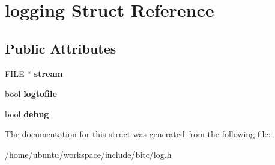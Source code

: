 \hypertarget{structlogging}{\section{logging Struct Reference}
\label{structlogging}
}
\subsection*{Public Attributes}
\begin{DoxyCompactItemize}
\item 
\hypertarget{structlogging_ac5910ff60fc85c3fe0586ee1e0fbaacf}{F\-I\-L\-E $\ast$ {\bfseries stream}}\label{structlogging_ac5910ff60fc85c3fe0586ee1e0fbaacf}

\item 
\hypertarget{structlogging_a8e95475cc91ec0b666e0fc2203f29031}{bool {\bfseries logtofile}}\label{structlogging_a8e95475cc91ec0b666e0fc2203f29031}

\item 
\hypertarget{structlogging_ac633ce153fc993365e6df971f6af73d5}{bool {\bfseries debug}}\label{structlogging_ac633ce153fc993365e6df971f6af73d5}

\end{DoxyCompactItemize}


The documentation for this struct was generated from the following file\-:\begin{DoxyCompactItemize}
\item 
/home/ubuntu/workspace/include/bitc/log.\-h\end{DoxyCompactItemize}
